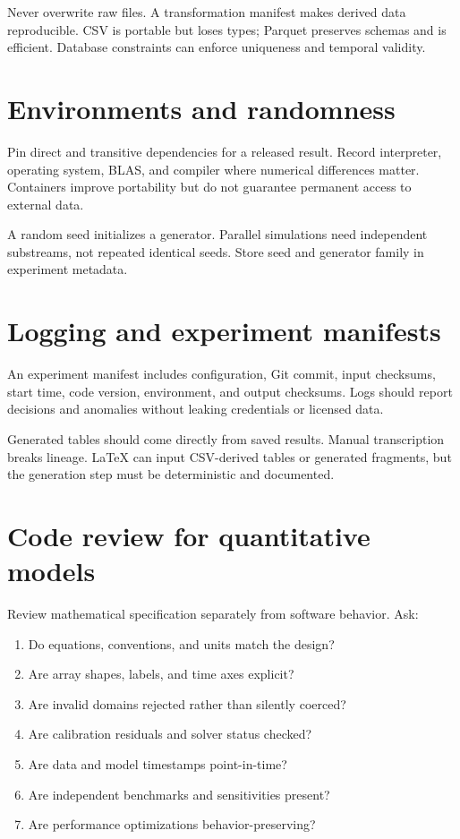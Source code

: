 Never overwrite raw files. A transformation manifest makes derived data reproducible.
CSV is portable but loses types; Parquet preserves schemas and is efficient. Database
constraints can enforce uniqueness and temporal validity.

\section{Environments and randomness}

Pin direct and transitive dependencies for a released result. Record interpreter,
operating system, BLAS, and compiler where numerical differences matter. Containers
improve portability but do not guarantee permanent access to external data.

A random seed initializes a generator. Parallel simulations need independent
substreams, not repeated identical seeds. Store seed and generator family in
experiment metadata.

\section{Logging and experiment manifests}

An experiment manifest includes configuration, Git commit, input checksums, start
time, code version, environment, and output checksums. Logs should report decisions
and anomalies without leaking credentials or licensed data.

Generated tables should come directly from saved results. Manual transcription
breaks lineage. LaTeX can input CSV-derived tables or generated fragments, but the
generation step must be deterministic and documented.

\section{Code review for quantitative models}

Review mathematical specification separately from software behavior. Ask:

\begin{enumerate}
\item Do equations, conventions, and units match the design?
\item Are array shapes, labels, and time axes explicit?
\item Are invalid domains rejected rather than silently coerced?
\item Are calibration residuals and solver status checked?
\item Are data and model timestamps point-in-time?
\item Are independent benchmarks and sensitivities present?
\item Are performance optimizations behavior-preserving?
\end{enumerate}

